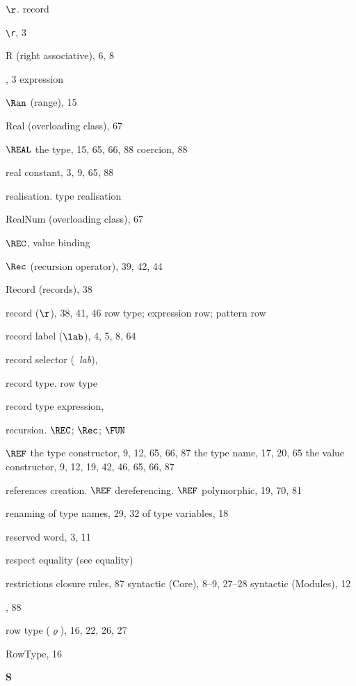 \begin{theindex}
\item $\r$. \see record
\item \verb+\r+, 3
\item R (right associative), 6, 8 
\item \RAISE, 3
\subitem \seealso expression
\item $\Ran$ (range), 15
\item Real (overloading class), 67
\item $\REAL$
\subitem the type, 15, 65, 66, 88
\subitem coercion, 88
\item real constant, 3, 9, 65, 88
\item realisation. \see type realisation
\item RealNum (overloading class), 67
\item $\REC$, \recrefs
\subitem \seealso value binding
\item $\Rec$ (recursion operator), 39, 42, 44
\item Record (records), 38
\item record ($\r$), 38, 41, 46
\subitem \seealso row type; expression row; pattern row
\item record label ($\lab$), 4, 5, 8, 64
\item record selector (\ml{\#}\ {\it lab}), \hashrefs
\item record type. \see row type
\item record type expression, \bracestyexprefs
\item recursion. \see $\REC$; $\Rec$; $\FUN$ 
\item $\REF$ 
\subitem the type constructor, 9, 12, 65, 66, 87
\subitem the type name, 17, 20, 65
\subitem the value constructor, 9, 12, 19, 42, 46, 65, 66, 87
\item references
\subitem creation. \see $\REF$
\subitem dereferencing. \see $\REF$
\subitem polymorphic, 19, 70, 81
\item renaming
\subitem of type names, 29, 32
\subitem of type variables, 18
\item reserved word, 3, 11
\item respect equality (see equality) 
\item restrictions 
\subitem closure rules, 87
\subitem syntactic (Core), 8--9, 27--28
\subitem syntactic (Modules), 12
\item {}, 88
\item row type ($\varrho$), 16, 22, 26, 27
\item RowType, 16
\indexspace

\parbox{64mm}{\hfil{\large\bf S}\hfil}


\end{theindex}
